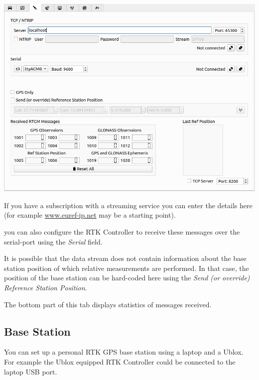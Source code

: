 \documentclass[12pt]{article} %
\begin{document}
\noindent\begin{minipage}{0.5\linewidth} 
\noindent \includegraphics[width=\textwidth]{./screens/RTCM_client.png}
\end{minipage}
\begin{minipage}{0.5\linewidth}
  If you have a subscription with a streaming service
  you can enter the details here (for example \url{www.euref-ip.net} may be a starting point).

you can also configure the RTK Controller to receive these messages
over the serial-port using the {\em Serial} field.

It is possible that the data stream does not contain information about
the base station position of which relative measurements are
performed. In that case, the position of the base station can be
hard-coded here using the {\em Send (or override) Reference Station
  Position}.
\end{minipage}
The bottom part of this tab displays statistics of messages received.  

\subsection{Base Station}

You can set up a personal RTK GPS base station using a laptop and a Ublox.
For example the Ublox equipped RTK Controller could be connected to the laptop USB port.
\end{document}
